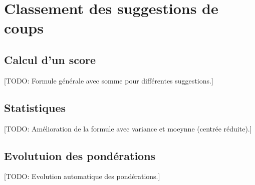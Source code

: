 \documentclass[a4paper,11pt]{report}
\begin{document}
\chapter{Classement des suggestions de coups}

\section{Calcul d'un score}
[TODO: Formule générale avec somme pour différentes suggestions.]

\section{Statistiques}
[TODO: Amélioration de la formule avec variance et moeynne (centrée réduite).]

\section{Evolutuion des pondérations}
[TODO: Evolution automatique des pondérations.]
\end{document}

